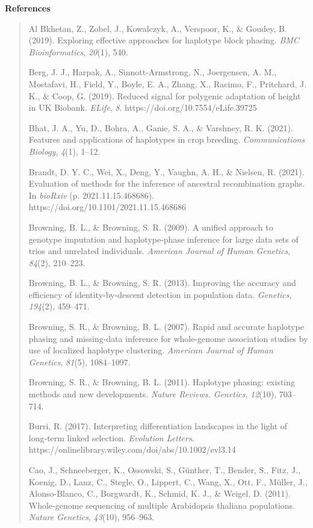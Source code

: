 \documentclass[
]{article}
\author{}
\date{}
\begin{document}
\textbf{References}

\begin{quote}
Al Bkhetan, Z., Zobel, J., Kowalczyk, A., Verspoor, K., \& Goudey, B.
(2019). Exploring effective approaches for haplotype block phasing.
\emph{BMC Bioinformatics}, \emph{20}(1), 540.

Berg, J. J., Harpak, A., Sinnott-Armstrong, N., Joergensen, A. M.,
Mostafavi, H., Field, Y., Boyle, E. A., Zhang, X., Racimo, F.,
Pritchard, J. K., \& Coop, G. (2019). Reduced signal for polygenic
adaptation of height in UK Biobank. \emph{ELife}, \emph{8}.
https://doi.org/10.7554/eLife.39725

Bhat, J. A., Yu, D., Bohra, A., Ganie, S. A., \& Varshney, R. K. (2021).
Features and applications of haplotypes in crop breeding.
\emph{Communications Biology}, \emph{4}(1), 1--12.

Brandt, D. Y. C., Wei, X., Deng, Y., Vaughn, A. H., \& Nielsen, R.
(2021). Evaluation of methods for the inference of ancestral
recombination graphs. In \emph{bioRxiv} (p. 2021.11.15.468686).
https://doi.org/10.1101/2021.11.15.468686

Browning, B. L., \& Browning, S. R. (2009). A unified approach to
genotype imputation and haplotype-phase inference for large data sets of
trios and unrelated individuals. \emph{American Journal of Human
Genetics}, \emph{84}(2), 210--223.

Browning, B. L., \& Browning, S. R. (2013). Improving the accuracy and
efficiency of identity-by-descent detection in population data.
\emph{Genetics}, \emph{194}(2), 459--471.

Browning, S. R., \& Browning, B. L. (2007). Rapid and accurate haplotype
phasing and missing-data inference for whole-genome association studies
by use of localized haplotype clustering. \emph{American Journal of
Human Genetics}, \emph{81}(5), 1084--1097.

Browning, S. R., \& Browning, B. L. (2011). Haplotype phasing: existing
methods and new developments. \emph{Nature Reviews. Genetics},
\emph{12}(10), 703--714.

Burri, R. (2017). Interpreting differentiation landscapes in the light
of long‐term linked selection. \emph{Evolution Letters}.
https://onlinelibrary.wiley.com/doi/abs/10.1002/evl3.14

Cao, J., Schneeberger, K., Ossowski, S., Günther, T., Bender, S., Fitz,
J., Koenig, D., Lanz, C., Stegle, O., Lippert, C., Wang, X., Ott, F.,
Müller, J., Alonso-Blanco, C., Borgwardt, K., Schmid, K. J., \& Weigel,
D. (2011). Whole-genome sequencing of multiple Arabidopsis thaliana
populations. \emph{Nature Genetics}, \emph{43}(10), 956--963.


\end{quote}
\end{document}
